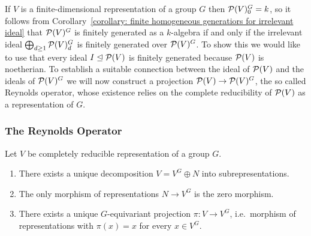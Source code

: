 \begin{fluff}
  If $V$ is a finite-dimensional representation of a group $G$ then $\mathcal{P}(V)^G_0 = k$, so it follows from Corollary~\ref{corollary: finite homogeneous generatiors for irrelevant ideal} that $\mathcal{P}(V)^G$ is finitely generated as a $k$-algebra if and only if the irrelevant ideal $\bigoplus_{d \geq 1} \mathcal{P}(V)^G_d$ is finitely generated over $\mathcal{P}(V)^G$.
  To show this we would like to use that every ideal $I \trianglelefteq \mathcal{P}(V)$ is finitely generated because $\mathcal{P}(V)$ is noetherian.
  To establish a suitable connection between the ideal of $\mathcal{P}(V)$ and the ideals of $\mathcal{P}(V)^G$ we will now construct a projection $\mathcal{P}(V) \to \mathcal{P}(V)^G$, the so called Reynolds operator, whose existence relies on the complete reducibility of $\mathcal{P}(V)$ as a representation of $G$.
\end{fluff}



\subsubsection{The Reynolds Operator}


\begin{proposition}
  \label{proposition: existence and uniqueness of Reynolds operators}
  Let $V$ be completely reducible representation of a group $G$.
  \begin{enumerate}
    \item
      \label{enumerate: invariants have unique direct complement}
      There exists a unique decomposition $V = V^G \oplus N$ into subrepresentations.
    \item
      \label{enumerate: morphism from invariants to N}
      The only morphism of representations $N \to V^G$ is the zero morphism.
    \item
      \label{enumerate: unique projecton onto invariants}
      There exists a unique $G$-equivariant projection $\pi \colon V \to V^G$, i.e.\ morphism of representations with $\pi(x) = x$ for every $x \in V^G$.
  \end{enumerate}
\end{proposition}


